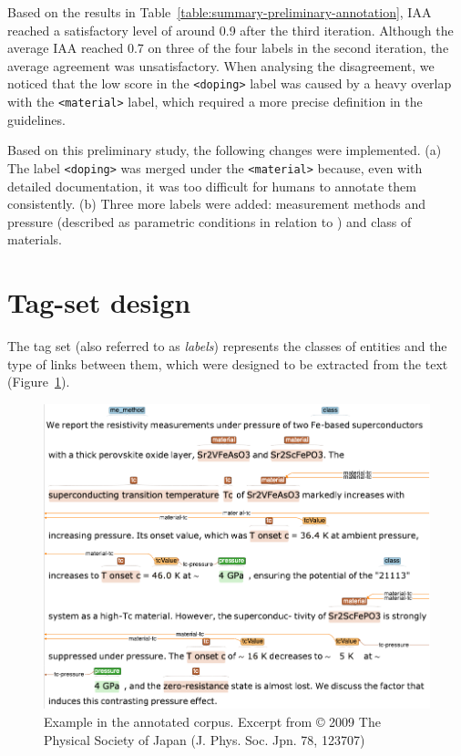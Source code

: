 Based on the results in Table~\ref{table:summary-preliminary-annotation}, IAA reached a satisfactory level of around 0.9 after the third iteration. 
Although the average IAA reached 0.7 on three of the four labels in the second iteration, the average agreement was unsatisfactory. 
When analysing the disagreement, we noticed that the low score in the \texttt{<doping>} label was caused by a heavy overlap with the \texttt{<material>} label, which required a more precise definition in the guidelines. 

Based on this preliminary study, the following changes were implemented. 
(a) The label \texttt{<doping>} was merged under the \texttt{<material>} because, even with detailed documentation, it was too difficult for humans to annotate them consistently.
(b) Three more labels were added: measurement methods and pressure (described as parametric conditions in relation to \tc) and class of materials. 

\section{Tag-set design}
The tag set (also referred to as \textit{labels}) represents the classes of entities and the type of links between them, which were designed to be extracted from the text (Figure~\ref{fig:example-annotations-and-links}).

\begin{figure}[htbp]
  \centering
  \includegraphics[width=\linewidth]{figures/supermat/Fig1.png}
  \caption{Example in the annotated corpus. Excerpt from © 2009 The Physical Society of Japan (J. Phys. Soc. Jpn. 78, 123707)}
  \label{fig:example-annotations-and-links}
\end{figure}


